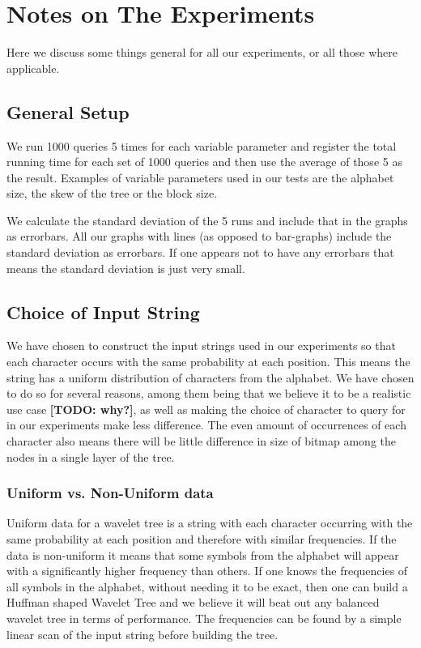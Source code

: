 \section{Notes on The Experiments}
Here we discuss some things general for all our experiments, or all those where applicable.

\subsection{General Setup}
\label{sec:ExpNotesGeneralSetup}
We run 1000 queries 5 times for each variable parameter and register the total running time for each set of 1000 queries and then use the average of those 5 as the result.
Examples of variable parameters used in our tests are the alphabet size, the skew of the tree or the block size.

We calculate the standard deviation of the 5 runs and include that in the graphs as errorbars.
All our graphs with lines (as opposed to bar-graphs) include the standard deviation as errorbars.
If one appears not to have any errorbars that means the standard deviation is just very small.

\subsection{Choice of Input String}
We have chosen to construct the input strings used in our experiments so that each character occurs with the same probability at each position.
This means the string has a uniform distribution of characters from the alphabet.
We have chosen to do so for several reasons, among them being that we believe it to be a realistic use case \textbf{[TODO: why?]}, as well as making the choice of character to query for in our experiments make less difference.
The even amount of occurrences of each character also means there will be little difference in size of bitmap among the nodes in a single layer of the tree.

\subsubsection{Uniform vs. Non-Uniform data}
\label{sec:expnotesUniformVsNonuniform}
Uniform data for a wavelet tree is a string with each character occurring with the same probability at each position and therefore with similar frequencies.
If the data is non-uniform it means that some symbols from the alphabet will appear with a significantly higher frequency than others.
If one knows the frequencies of all symbols in the alphabet, without needing it to be exact, then one can build a Huffman shaped Wavelet Tree and we believe it will beat out any balanced wavelet tree in terms of performance.
The frequencies can be found by a simple linear scan of the input string before building the tree.

